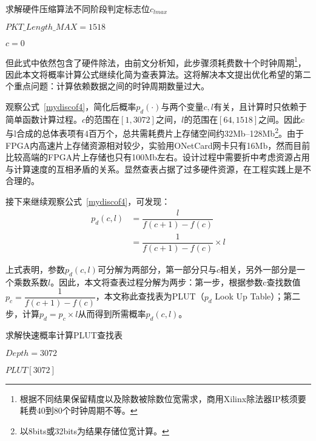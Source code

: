 \begin{algorithm}[ht]
	\caption{求解硬件压缩算法不同阶段判定标志位$c_{lmax}$  \label{mydiscoa2}}
	\IncMargin{2em}
	\DontPrintSemicolon
	$ 	PKT\_Length\_MAX = 1518 $
	
	$ c=0 $
	
	
\end{algorithm}

但此式中依然包含了硬件除法，由前文分析知，此步骤须耗费数十个时钟周期\footnote{根据不同结果保留精度以及除数被除数位宽需求，商用Xilinx除法器IP核须要耗费40到80个时钟周期不等。}，因此本文将概率计算公式继续化简为查表算法。这将解决本文提出优化希望的第二个重点问题：计算依赖数据之间的时钟周期数量过大。

观察公式~\ref{mydiscof4}，简化后概率$ p_d(\cdot) $与两个变量$ c,l $有关，且计算时只依赖于简单函数计算过程。$ c $的范围在$ [1,3072] $之间，$ l $的范围在$ [64,1518] $之间。因此c与l合成的总体表项有4百万个，总共需耗费片上存储空间约32Mb--128Mb\footnote{以8bits或32bits为结果存储位宽计算。}。由于FPGA内高速片上存储资源相对较少，实验用ONetCard网卡只有16Mb，然而目前比较高端的FPGA片上存储也只有100Mb左右。设计过程中需要折中考虑资源占用与计算速度的互相矛盾的关系。显然查表占据了过多硬件资源，在工程实践上是不合理的。

接下来继续观察公式~\ref{mydiscof4}，可发现：
\begin{align}\label{mydiscof5}
p_d(c,l) &= \dfrac{l}{f(c+1)-f(c)}   \nonumber \\
&= \dfrac{1}{f(c+1)-f(c)} \times l 
\end{align}

上式表明，参数$ p_d(c,l) $可分解为两部分，第一部分只与$ c $相关，另外一部分是一个乘数系数$l$。因此，本文将查表过程分解为两步：第一步，根据参数c查找数值$ p_c= \dfrac{1}{f(c+1)-f(c)} $，本文称此查找表为PLUT（$p_d$ Look Up Table）；第二步，计算$ p_d = p_c \times l $从而得到所需概率$ p_d(c,l) $。

\begin{algorithm}[ht]
	\caption{求解快速概率计算PLUT查找表  \label{mydiscoa3}}
	\IncMargin{2em}
	\DontPrintSemicolon
	$Depth = 3072 $ 
	
	$ PLUT[3072] $
	
\end{algorithm}



